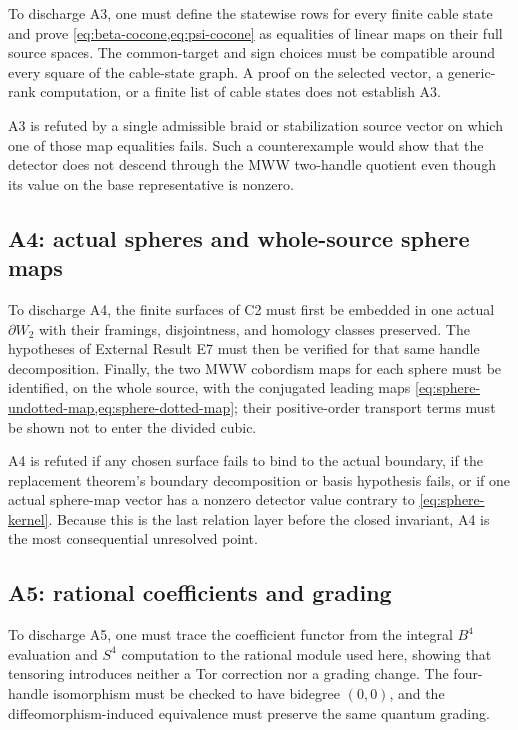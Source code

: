 \documentclass[10pt,reqno]{amsart}
\theoremstyle{definition}
\theoremstyle{remark}
\begin{document}
To discharge A3, one must define the statewise rows for every finite cable
state and prove \cref{eq:beta-cocone,eq:psi-cocone} as equalities of linear
maps on their full source spaces.  The common-target and sign choices must be
compatible around every square of the cable-state graph.  A proof on the
selected vector, a generic-rank computation, or a finite list of cable states
does not establish A3.

A3 is refuted by a single admissible braid or stabilization source vector on
which one of those map equalities fails.  Such a counterexample would show
that the detector does not descend through the MWW two-handle quotient even
though its value on the base representative is nonzero.

\subsection{A4: actual spheres and whole-source sphere maps}

To discharge A4, the finite surfaces of C2 must first be embedded in one
actual $\partial W_2$ with their framings, disjointness, and homology classes
preserved.  The hypotheses of External Result E7 must then be verified for
that same handle decomposition.  Finally, the two MWW cobordism maps for each
sphere must be identified, on the whole source, with the conjugated leading
maps \cref{eq:sphere-undotted-map,eq:sphere-dotted-map}; their positive-order
transport terms must be shown not to enter the divided cubic.

A4 is refuted if any chosen surface fails to bind to the actual boundary, if
the replacement theorem's boundary decomposition or basis hypothesis fails,
or if one actual sphere-map vector has a nonzero detector value contrary to
\cref{eq:sphere-kernel}.  Because this is the last relation layer before the
closed invariant, A4 is the most consequential unresolved point.

\subsection{A5: rational coefficients and grading}

To discharge A5, one must trace the coefficient functor from the integral
$B^4$ evaluation and $S^4$ computation to the rational module used here,
showing that tensoring introduces neither a Tor correction nor a grading
change.  The four-handle isomorphism must be checked to have bidegree $(0,0)$,
and the diffeomorphism-induced equivalence must preserve the same quantum
grading.
\end{document}

